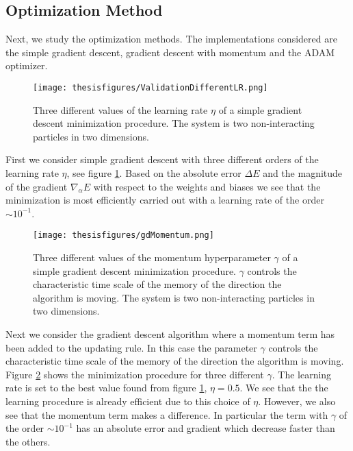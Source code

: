 \documentclass[twoside,english]{uiofysmaster}
\begin{document}
\subsection{Optimization Method}
Next, we study the optimization methods. The implementations considered are the simple gradient descent, gradient descent with momentum and the ADAM optimizer. 


\begin{figure}
\centering
 \texttt{[image: thesisfigures/ValidationDifferentLR.png]}
 \caption{Three different values of the learning rate $\eta$ of a simple gradient descent minimization procedure. The system is two non-interacting particles in two dimensions.}
 \label{fig:ValidationDifferentLR}
\end{figure}


First we consider simple gradient descent with three different orders of the learning rate $\eta$, see figure \ref{fig:ValidationDifferentLR}. Based on the absolute error $\Delta E$ and the magnitude of the gradient $\nabla_\alpha E$ with respect to the weights and biases we see that the minimization is most efficiently carried out with a learning rate of the order $\sim 10^{-1}$. 




\begin{figure}
\centering
 \texttt{[image: thesisfigures/gdMomentum.png]}
 \caption{Three different values of the momentum hyperparameter $\gamma$ of a simple gradient descent minimization procedure. $\gamma$ controls the characteristic time scale of the memory of the direction the algorithm is moving. The system is two non-interacting particles in two dimensions.}
 \label{fig:gdMomentum}
\end{figure}

Next we consider the gradient descent algorithm where a momentum term has been added to the updating rule. In this case the parameter $\gamma$ controls the characteristic time scale of the memory of the direction the algorithm is moving. Figure \ref{fig:gdMomentum} shows the minimization procedure for three different $\gamma$. The learning rate is set to the best value found from figure \ref{fig:ValidationDifferentLR}, $\eta=0.5$. We see that the the learning procedure is already efficient due to this choice of $\eta$. However, we also see that the momentum term makes a difference. In particular the term with $\gamma$ of the order $\sim 10^{-1}$ has an absolute error and gradient which decrease faster than the others. 
\end{document}
